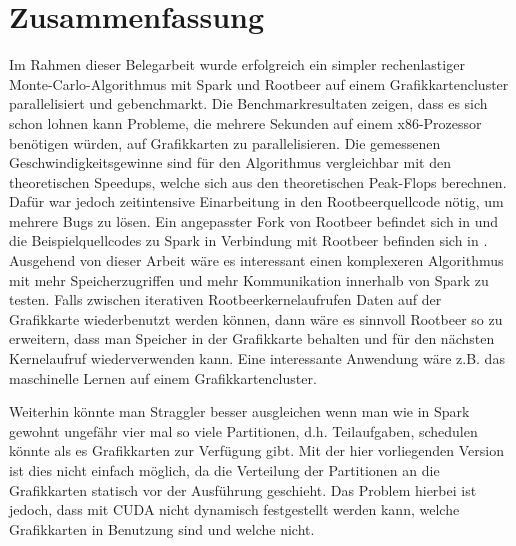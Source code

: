 
\chapter{Zusammenfassung}


Im Rahmen dieser Belegarbeit wurde erfolgreich ein simpler rechenlastiger Monte-Carlo-Algorithmus mit Spark und Rootbeer auf einem Grafikkartencluster parallelisiert und gebenchmarkt.
Die Benchmarkresultaten zeigen, dass es sich schon lohnen kann Probleme, die mehrere Sekunden auf einem x86-Prozessor benötigen würden, auf Grafikkarten zu parallelisieren.
Die gemessenen Geschwindigkeitsgewinne sind für den Algorithmus vergleichbar mit den theoretischen Speedups, welche sich aus den theoretischen Peak-Flops berechnen.
Dafür war jedoch zeitintensive Einarbeitung in den Rootbeerquellcode nötig, um mehrere Bugs zu lösen.
Ein angepasster Fork von Rootbeer befindet sich in \cite{ownrootbeerfork} und die Beispielquellcodes zu Spark in Verbindung mit Rootbeer befinden sich in \cite{scaromare}.\\



Ausgehend von dieser Arbeit wäre es interessant einen komplexeren Algorithmus mit mehr Speicherzugriffen und mehr Kommunikation innerhalb von Spark zu testen.
Falls zwischen iterativen Rootbeerkernelaufrufen Daten auf der Grafikkarte wiederbenutzt werden können, dann wäre es sinnvoll Rootbeer so zu erweitern, dass man Speicher in der Grafikkarte behalten und für den nächsten Kernelaufruf wiederverwenden kann.
Eine interessante Anwendung wäre z.B. das maschinelle Lernen auf einem Grafikkartencluster.

Weiterhin könnte man Straggler besser ausgleichen wenn man wie in Spark gewohnt ungefähr vier mal so viele Partitionen, d.h. Teilaufgaben, schedulen könnte als es Grafikkarten zur Verfügung gibt.
Mit der hier vorliegenden Version ist dies nicht einfach möglich, da die Verteilung der Partitionen an die Grafikkarten statisch vor der Ausführung geschieht.
Das Problem hierbei ist jedoch, dass mit CUDA nicht dynamisch festgestellt werden kann, welche Grafikkarten in Benutzung sind und welche nicht.
